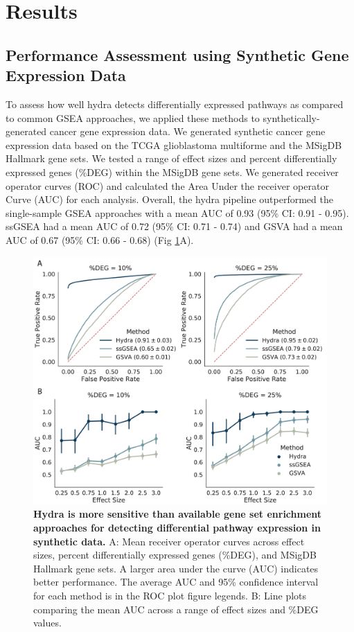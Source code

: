 \documentclass[10pt,letterpaper]{article}
\begin{document}
\section*{Results}
\subsection{Performance Assessment using Synthetic Gene Expression Data}
To assess how well hydra detects differentially expressed pathways as compared to common GSEA approaches, we applied these methods to synthetically-generated cancer gene expression data. We generated synthetic cancer gene expression data based on the TCGA glioblastoma multiforme and the MSigDB Hallmark gene sets. We tested a range of effect sizes and percent differentially expressed genes (\%DEG) within the MSigDB gene sets. We generated receiver operator curves (ROC) and calculated the Area Under the receiver operator Curve (AUC) for each analysis. Overall, the hydra pipeline outperformed the single-sample GSEA approaches with a mean AUC of 0.93 (95\% CI: 0.91 - 0.95). ssGSEA had a mean AUC of 0.72 (95\% CI: 0.71 - 0.74) and GSVA had a mean AUC of 0.67 (95\% CI: 0.66 - 0.68) (Fig \ref{rocplot}A).

\begin{figure}[!h]
	\includegraphics[width=\textwidth]{img/ROC-PLOT-2x}
	\caption{{\bf Hydra is more sensitive than available gene set enrichment approaches for detecting differential pathway expression in synthetic data.}
		A: Mean receiver operator curves across effect sizes, percent differentially expressed genes (\%DEG), and MSigDB Hallmark gene sets. A larger area under the curve (AUC) indicates better performance. The average AUC and 95\% confidence interval for each method is in the ROC plot figure legends. B: Line plots comparing the mean AUC across a range of effect sizes and \%DEG values. 
		\label{rocplot}}
\end{figure}
\end{document}
